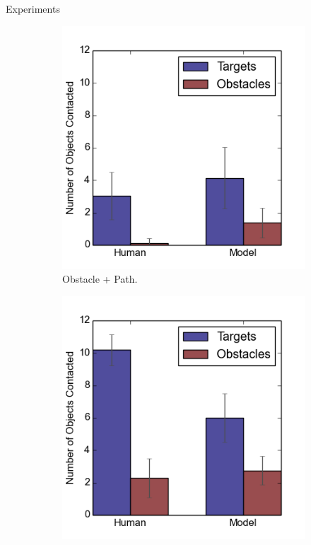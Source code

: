\documentclass[final]{beamer}
\begin{document}
\begin{frame}{}
\begin{textblock}{86}
\begin{block}{Experiments}
\begin{figure}[h]
\begin{subfigure}[b]{0.24\textwidth}
\includegraphics[width=\textwidth]{contact2.png}
\caption{Obstacle + Path.}
\end{subfigure}
\begin{subfigure}[b]{0.24\textwidth}
\includegraphics[width=\textwidth]{contact3.png}

\end{subfigure}
\end{figure}
\end{block}
\end{textblock}
\end{frame}
\end{document}
